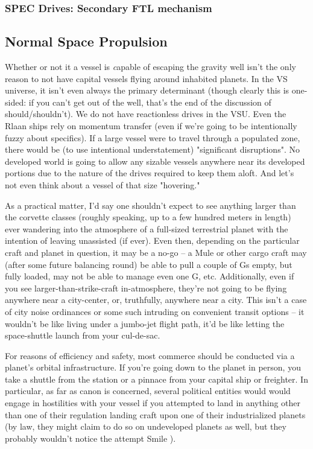 \subsubsection{SPEC Drives: Secondary FTL mechanism}

\subsection{Normal Space Propulsion}

Whether or not it a vessel is {\emph capable} of escaping the gravity well
isn't the only reason to not have capital vessels flying around
inhabited planets. In the VS universe, it isn't even always the
primary determinant (though clearly this is one-sided: if you can't
get out of the well, that's the end of the discussion of
should/shouldn't). We do not have reactionless drives in the VSU. Even
the Rlaan ships rely on momentum transfer (even if we're going to be
intentionally fuzzy about specifics). If a large vessel were to travel
through a populated zone, there would be (to use intentional
understatement) "significant disruptions". No developed world is going
to allow any sizable vessels anywhere near its developed portions due
to the nature of the drives required to keep them aloft. And let's not
even think about a vessel of that size "hovering."

As a practical matter, I'd say one shouldn't expect to see anything
larger than the corvette classes (roughly speaking, up to a few
hundred meters in length) ever wandering into the atmosphere of a
full-sized terrestrial planet with the intention of leaving unassisted
(if ever). Even then, depending on the particular craft and planet in
question, it may be a no-go -- a Mule or other cargo craft may (after
some future balancing round) be able to pull a couple of Gs empty, but
fully loaded, may not be able to manage even one G, etc. Additionally,
even if you see larger-than-strike-craft in-atmosphere, they're not
going to be flying anywhere near a city-center, or, truthfully,
anywhere near a city. This isn't a case of city noise ordinances or
some such intruding on convenient transit options -- it wouldn't be
like living under a jumbo-jet flight path, it'd be like letting the
space-shuttle launch from your cul-de-sac.

For reasons of efficiency and safety, most commerce should be
conducted via a planet's orbital infrastructure. If you're going down
to the planet in person, you take a shuttle from the station or a
pinnace from your capital ship or freighter. In particular, as far as
canon is concerned, several political entities would would engage in
hostilities with your vessel if you attempted to land in anything
other than one of their regulation landing craft upon one of their
industrialized planets (by law, they might claim to do so on
undeveloped planets as well, but they probably wouldn't notice the
attempt Smile ).

